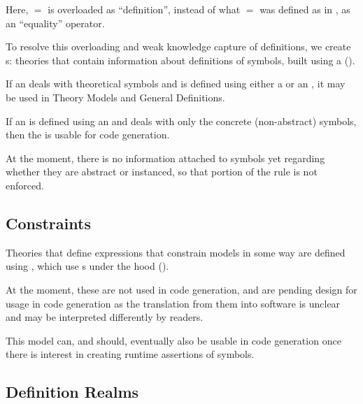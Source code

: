 Here, \(=\) is overloaded as ``definition'', instead of what \(=\) was defined
as in \Expr{}, as an ``equality'' operator.

To resolve this overloading and weak knowledge capture of definitions, we create
\EquationalModel{}s: theories that contain information about definitions of
symbols, built using a \QDefinition{} ().

If an \EquationalModel{} deals with theoretical symbols and is defined using
either a \ModelExpr{} or an \Expr{}, it may be used in Theory Models and General
Definitions.

If an \EquationalModel{} is defined using an \Expr{} and deals with only the
concrete (non-abstract) symbols, then the \EquationalModel{} is usable for code
generation.

At the moment, there is no information attached to symbols yet regarding whether
they are abstract or instanced, so that portion of the rule is not enforced.


\subsection{Constraints}

\currentConstraintSetHaskell{}

Theories that define expressions that constrain models in some way are defined
using \EquationalConstraints{}, which use \ConstraintSet{}s under the hood
().
	
At the moment, these are not used in code generation, and are pending design for
usage in code generation as the translation from them into software is unclear
and may be interpreted differently by readers.

This model can, and should, eventually also be usable in code generation once
there is interest in creating runtime assertions of symbols.


\subsection{Definition Realms}

\currentDefiningExprHaskell{}

